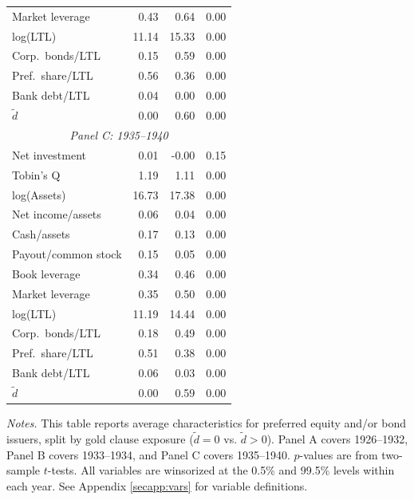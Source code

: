 \begin{table}[p]
\begin{threeparttable}
\begin{tabular}{lrrr}
            Market leverage & 0.43 & 0.64 & 0.00 \\
            log(LTL) & 11.14 & 15.33 & 0.00 \\
            Corp.\ bonds/LTL & 0.15 & 0.59 & 0.00 \\
            Pref.\ share/LTL & 0.56 & 0.36 & 0.00 \\
            Bank debt/LTL & 0.04 & 0.00 & 0.00 \\
            \ensuremath{\tilde{d}} & 0.00 & 0.60 & 0.00 \\
            \midrule
            \multicolumn{4}{c}{\textit{Panel C: 1935--1940}} \\
            \midrule
            Net investment & 0.01 & -0.00 & 0.15 \\
            Tobin's Q & 1.19 & 1.11 & 0.00 \\
            log(Assets) & 16.73 & 17.38 & 0.00 \\
            Net income/assets & 0.06 & 0.04 & 0.00 \\
            Cash/assets & 0.17 & 0.13 & 0.00 \\
            Payout/common stock & 0.15 & 0.05 & 0.00 \\
            Book leverage & 0.34 & 0.46 & 0.00 \\
            Market leverage & 0.35 & 0.50 & 0.00 \\
            log(LTL) & 11.19 & 14.44 & 0.00 \\
            Corp.\ bonds/LTL & 0.18 & 0.49 & 0.00 \\
            Pref.\ share/LTL & 0.51 & 0.38 & 0.00 \\
            Bank debt/LTL & 0.06 & 0.03 & 0.00 \\
            \ensuremath{\tilde{d}} & 0.00 & 0.59 & 0.00 \\
            \bottomrule
        \end{tabular}
    \end{threeparttable}
    
    \vspace*{3mm} \justifying \noindent
\scriptsize{\textit{Notes.} This table reports average characteristics for preferred equity and/or bond issuers, split by gold clause exposure ($\tilde{d} = 0$ vs. $\tilde{d} > 0$). Panel A covers 1926--1932, Panel B covers 1933--1934, and Panel C covers 1935--1940. $p$-values are from two-sample $t$-tests. All variables are winsorized at the 0.5\% and 99.5\% levels within each year. See Appendix \ref{secapp:vars} for variable definitions.}
\end{table}